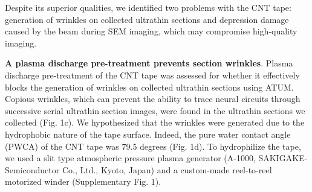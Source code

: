\documentclass{article}
\begin{document}
Despite its superior qualities, we identified two problems with the CNT tape: generation of wrinkles on collected ultrathin sections and depression damage caused by the beam during SEM imaging, which may compromise high-quality imaging.

\textbf{A plasma discharge pre-treatment prevents section wrinkles}. Plasma discharge pre-treatment of the CNT tape was assessed for whether it effectively blocks the generation of wrinkles on collected ultrathin sections using ATUM. Copious wrinkles, which can prevent the ability to trace neural circuits through successive serial ultrathin section images, were found in the ultrathin sections we collected (Fig. 1c). We hypothesized that the wrinkles were generated due to the hydrophobic nature of the tape surface. Indeed, the pure water contact angle (PWCA) of the CNT tape was 79.5 degrees (Fig. 1d). To hydrophilize the tape, we used a slit type atmospheric pressure plasma generator (A-1000, SAKIGAKE-Semiconductor Co., Ltd., Kyoto, Japan) and a 
custom-made reel-to-reel motorized winder (Supplementary Fig. 1).
\end{document}
